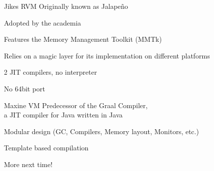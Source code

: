 \documentclass[
14pt,
aspectratio=169,
usenames,
dvipsnames,
x11names]{beamer}
\begin{document}
\begin{frame}{Jikes RVM}
  Originally known as \alert{Jalape\~no}

  \vfill

  Adopted by the \alert{academia}

  \vfill

  Features the \alert{Memory Management Toolkit} (MMTk)

  \vfill

  Relies on a \alert{magic} layer for its implementation on different platforms

  \vfill

  2 JIT compilers, \alert{no interpreter}

  \vfill

  No 64bit port
\end{frame}

\begin{frame}{Maxine VM}
  Predecessor of the Graal Compiler,\\ a JIT compiler for Java written in Java

  \vfill

  Modular design (GC, Compilers, Memory layout, Monitors, etc.)

  \vfill

  Template based compilation

  \vfill

  More next time!
\end{frame}



\end{document}
